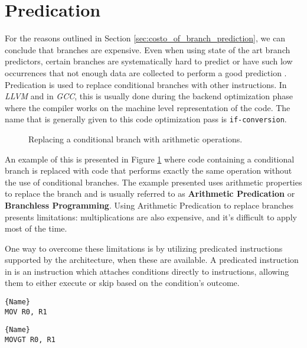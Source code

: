 \section{Predication}
\label{sec:predication}

For the reasons outlined in Section \ref{sec:costo_of_branch_prediction}, we can conclude that branches are expensive. Even when using state of the art branch predictors, certain branches are systematically hard to predict or have such low occurrences that not enough data are collected to perform a good prediction \cite{lin2019branch}.
Predication is used to replace conditional branches with other instructions. In \textit{LLVM} and in \textit{GCC}, this is usually done during the backend optimization phase where the compiler works on the machine level representation of the code. The name that is generally given to this code optimization pass is \texttt{if-conversion}.

\begin{figure}[h!]
\centering

\caption{Replacing a conditional branch with arithmetic operations.}
\label{fig:branching_predication_example}
\end{figure}

An example of this is presented in Figure \ref{fig:branching_predication_example} where code containing a conditional branch is replaced with code that performs exactly the same operation without the use of conditional branches. The example presented uses arithmetic properties to replace the branch and is usually referred to as \textbf{Arithmetic Predication} or \textbf{Branchless Programming}. Using Arithmetic Predication to replace branches presents limitations: multiplications are also expensive, and it's difficult to apply most of the time.

One way to overcome these limitations is by utilizing predicated instructions supported by the architecture, when these are available.
A predicated instruction in \armvs is an instruction which attaches conditions directly to instructions, allowing them to either execute or skip based on the condition's outcome.

\noindent\begin{minipage}{.45\textwidth}
\begin{lstlisting}[caption=Standard MOV in ARMv7 assembly, style=AsmStyle]{Name}
MOV R0, R1
\end{lstlisting}
\label{lst:add}
\end{minipage}\hfill
\begin{minipage}{.45\textwidth}
\begin{lstlisting}[caption=Predicated MOV in ARMv7 assembly,style=AsmStyle]{Name}
MOVGT R0, R1
\end{lstlisting}
\label{lst:cadd}
\end{minipage}

